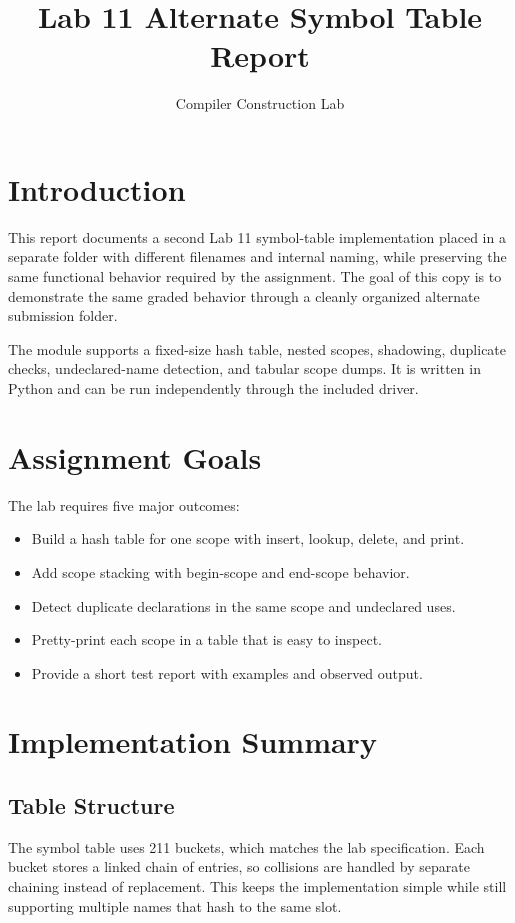 \documentclass[11pt]{article}
\title{Lab 11 Alternate Symbol Table Report}
\author{Compiler Construction Lab}
\date{}
\begin{document}
\maketitle

\section{Introduction}
This report documents a second Lab 11 symbol-table implementation placed in a separate folder with different filenames and internal naming, while preserving the same functional behavior required by the assignment. The goal of this copy is to demonstrate the same graded behavior through a cleanly organized alternate submission folder.

The module supports a fixed-size hash table, nested scopes, shadowing, duplicate checks, undeclared-name detection, and tabular scope dumps. It is written in Python and can be run independently through the included driver.

\section{Assignment Goals}
The lab requires five major outcomes:
\begin{itemize}[leftmargin=1.25em]
  \item Build a hash table for one scope with insert, lookup, delete, and print.
  \item Add scope stacking with begin-scope and end-scope behavior.
  \item Detect duplicate declarations in the same scope and undeclared uses.
  \item Pretty-print each scope in a table that is easy to inspect.
  \item Provide a short test report with examples and observed output.
\end{itemize}

\section{Implementation Summary}
\subsection{Table Structure}
The symbol table uses 211 buckets, which matches the lab specification. Each bucket stores a linked chain of entries, so collisions are handled by separate chaining instead of replacement. This keeps the implementation simple while still supporting multiple names that hash to the same slot.
\end{document}
